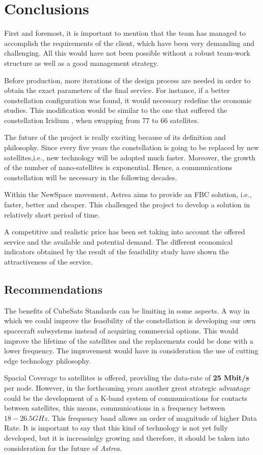 \chapter{Conclusions}

First and foremost, it is important to mention that the team has managed to accomplish the requirements of the client, which have been very demanding and challenging. All this would have not been possible without a robust team-work structure as well as a good management strategy.

Before production, more iterations of the design process are needed in order to obtain the exact parameters of the final service. For instance, if a better constellation configuration was found, it would necessary redefine the economic studies. This modification would be similar to the one that suffered the constellation Iridium \cite{Iridium}, when swapping from 77 to 66 satellites.

The future of the project is really exciting because of its definition and philosophy. Since every five years the constellation is going to be replaced by new satellites,i.e., new technology will be adopted much faster. Moreover, the growth of the number of nano-satellites is exponential. Hence, a communications constellation will be necessary in the following decades.

Within the NewSpace movement, Astrea aims to provide an FBC solution, i.e., faster, better and cheaper. This challenged the project to develop a solution in relatively short period of time.  

A competitive and realistic price has been set taking into account the offered service and the available and potential demand. The different economical indicators obtained by the result of the feasibility study have shown the attractiveness of the service.
\newpage

\section{Recommendations}
The benefits of CubeSats Standards can be limiting in some aspects. A way in which we could improve the feasibility of the constellation is developing our own spacecraft subsystems instead of acquiring commercial options. This would improve the lifetime of the satellites and the replacements could be done with a lower frequency. The improvement would have in consideration the use of cutting edge technology philosophy.

Spacial Coverage to satellites is offered, providing the data-rate of \textbf{25 Mbit/s} per node. However, in the forthcoming years another great strategic advantage could be the development of a K-band system of communications for contacts between satellites, this means, communications in a frequency between $18-26.5 GHz$. This frequency band allows an order of magnitude of higher Data Rate. It is important to say that this kind of technology is not yet fully developed, but it is increasinlgy growing and therefore, it should be taken into consideration for the future of \textit{Astrea}.
